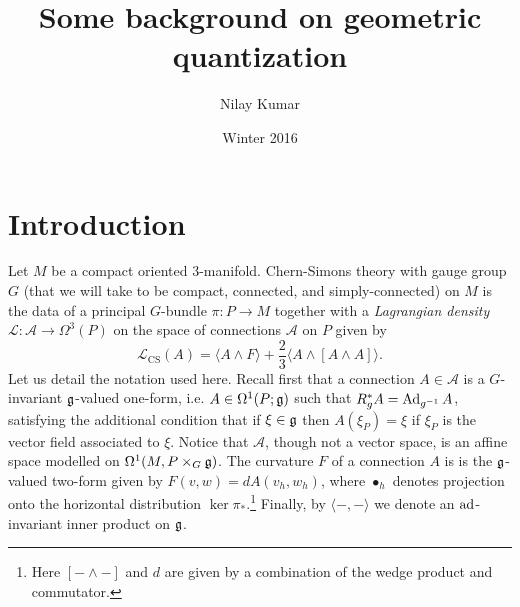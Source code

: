 \documentclass{amsart}
\title{Some background on geometric quantization}
\author{Nilay Kumar}
\date{Winter 2016}
\begin{document}
\maketitle
\tableofcontents

\section{Introduction}
Let $M$ be a compact oriented 3-manifold. Chern-Simons theory with gauge
group $G$ (that we will take to be compact, connected, and simply-connected) on $M$ is the data of a principal
$G$-bundle $\pi:P\to M$ together with a
\textit{Lagrangian density} $\mathscr{L}:\mathscr{A}\to \Omega^3(P)$ on the space of connections $\mathscr{A}$ on $P$
given by
\begin{equation*}
    \mathscr{L}_\text{CS}(A) = \langle A\wedge F\rangle + \frac{2}{3}\langle A\wedge [A\wedge A]\rangle.
\end{equation*}
Let us detail the notation used here. Recall first that a connection $A\in\mathscr{A}$ is
a $G$-invariant $\mathfrak g$-valued one-form, i.e. $A\in \Omega^1(P;\mathfrak g)$ such that
$R_g^*A = \operatorname{Ad}_{g^{-1}}A$, satisfying the additional condition that if $\xi\in\mathfrak g$ then
$A(\xi_P)=\xi$ if $\xi_P$ is the vector field associated to $\xi$. Notice that $\mathscr{A}$,
though not a vector space, is an affine space modelled on $\Omega^1(M,P\times_G\mathfrak g)$.
The curvature $F$ of a connection $A$ is is the $\mathfrak g$-valued two-form given by $F(v,w) = dA(v_h,w_h)$,
where $\bullet_h$ denotes projection onto the horizontal distribution $\ker\pi_*$.\footnote{Here
$[-\wedge-]$ and $d$ are given by a combination of the wedge product and commutator.}
Finally, by $\langle-,-\rangle$ we denote an $\operatorname{ad}$-invariant inner product on $\mathfrak g$.
\end{document}
